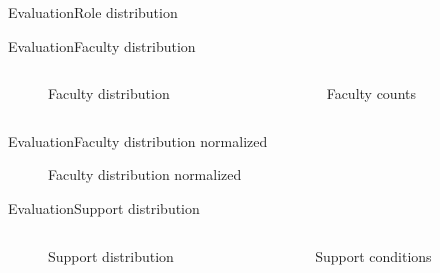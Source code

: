 \newcommand{\singleHeight}{0.7}

\begin{frame}{Evaluation}{Role distribution}
  \begin{figure}
    \centering
    
  \end{figure}
\end{frame}

\begin{frame}{Evaluation}{Faculty distribution}
  \begin{columns}
    \begin{column}{0.5\textwidth}
      \begin{figure}
        \centering
        
        \caption{Faculty distribution}
      \end{figure}
    \end{column}
    \begin{column}{0.5\textwidth}
      \begin{figure}
        \centering
        
        \caption{Faculty counts}
      \end{figure}
    \end{column}
  \end{columns}
\end{frame}

\begin{frame}{Evaluation}{Faculty distribution normalized}
  \begin{figure}
    \centering
    
    \caption{Faculty distribution normalized}
  \end{figure}
\end{frame}

\begin{frame}{Evaluation}{Support distribution}
  \begin{columns}
    \begin{column}{0.5\textwidth}
      \begin{figure}
        \centering
        
        \caption{Support distribution}
      \end{figure}
    \end{column}
    \begin{column}{0.5\textwidth}
      \begin{figure}
        \centering
        
        \caption{Support conditions}
      \end{figure}
    \end{column}
  \end{columns}
\end{frame}

